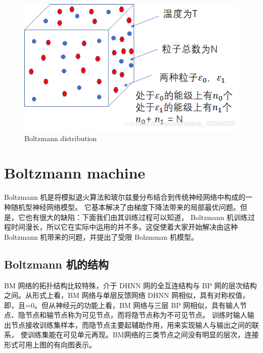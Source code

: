 \begin{figure}[H]
\centering
\includegraphics[scale=0.382]{pix/Boltzmann/Boltzmann_distribution.png}
\caption{Boltzmann distribution}
\label{fig:Boltzmann_distribution}
\end{figure}


\section{Boltzmann machine}

Boltzmann 机是将模拟退火算法和玻尔兹曼分布结合到传统神经网络中构成的一种随机型神经网络模型。
它基本解决了由梯度下降法带来的局部最优问题。但是，它也有很大的缺陷：下面我们由其训练过程可以知道，
Boltzmann 机训练过程时间漫长，所以它在实际中运用的并不多。这促使着大家开始解决由这种 Boltzmann 
机带来的问题，并提出了受限 Bolzmman 机模型。


\subsection{Boltzmann 机的结构}

BM 网络的拓扑结构比较特殊，介于 DHNN 网的全互连结构与 BP 网的层次结构之间。从形式上看，BM 
网络与单层反馈网络 DHNN 网相似，具有对称权值，即，且=0。但从神经元的功能上看，BM 网络与三层 BP 
网相似，具有输人节点、隐节点和输节点称为可见节点，而将隐节点称为不可见节点。
训练时输人输出节点接收训练集样本，而隐节点主要起辅助作用，用来实现输人与输出之间的联系，
使训练集能在可见单元再现。BM网络的三类节点之间没有明显的层次，连接形式可用上图的有向图表示。

